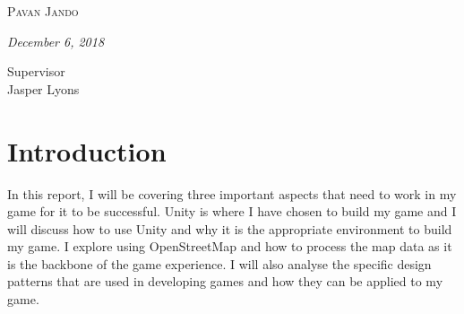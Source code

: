 \documentclass[a4paper]{report}
\begin{document}
\begin{titlepage}
	{\scshape\Large Pavan Jando \\} %
	
	\vspace{0.5\baselineskip} %
	
	\textit{December 6, 2018} %
	
	\vfill %
	
	
	
	\vspace{0.3\baselineskip} %
	
	Supervisor \\ Jasper Lyons
	
\end{titlepage}


\renewcommand{\thesection}{\arabic{section}}
\tableofcontents
\pagebreak

\section{Introduction}
In this report, I will be covering three important aspects that need to work in my game for it to be successful. Unity is where I have chosen to build my game and I will discuss how to use Unity and why it is the appropriate environment to build my game. I explore using OpenStreetMap and how to process the map data as it is the backbone of the game experience. I will also analyse the specific design patterns that are used in developing games and how they can be applied to my game.
\end{document}
